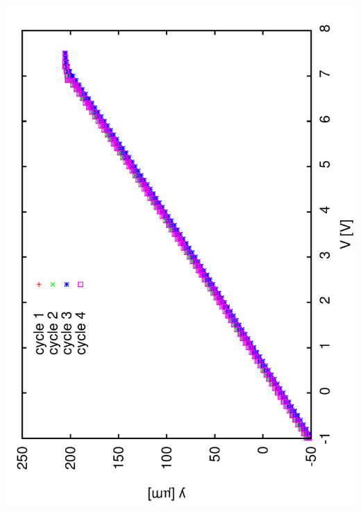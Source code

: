 \documentclass[a4paper,11pt]{book}
\begin{document}
\includegraphics[angle=-90,scale=0.10]{image22.pdf}
\end{document}
